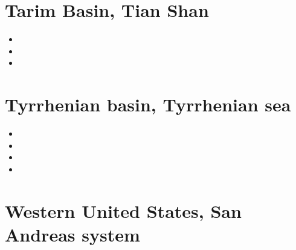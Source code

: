 \section{Tarim Basin, Tian Shan} 

\begin{small}
\begin{itemize}
\item[\nineteenninetyseven] 
\item[\twothousandtwentytwo] 
\item[\twothousandtwentyfive] 
\end{itemize}
\end{small}


\section{Tyrrhenian basin, Tyrrhenian sea} 
\begin{small}
\begin{itemize}
\item[1995] 
\item[1996] 
\item[2022] 
\item[2026] 
\end{itemize}
\end{small}




\section{Western United States, San Andreas system}

